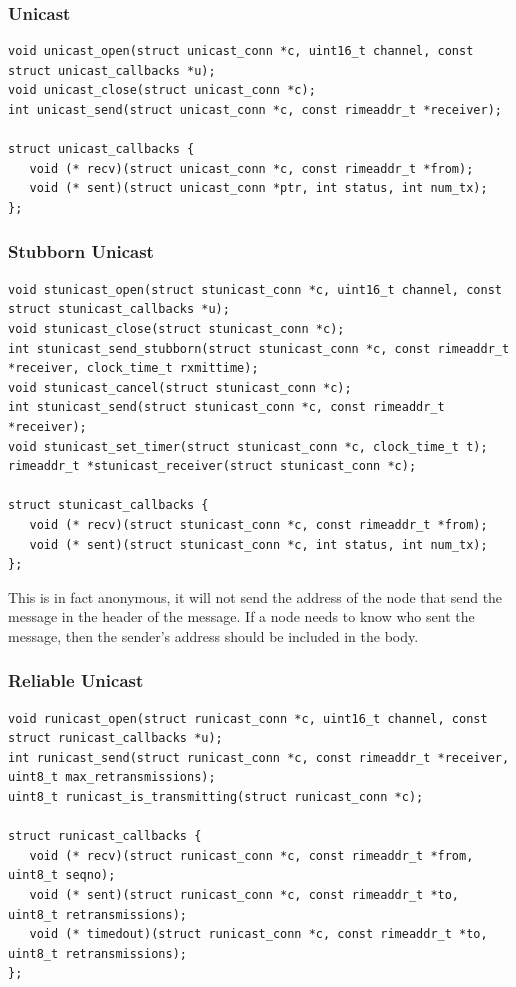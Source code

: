 \subsubsection{Unicast}

\begin{verbatim}
void unicast_open(struct unicast_conn *c, uint16_t channel, const struct unicast_callbacks *u);
void unicast_close(struct unicast_conn *c);
int unicast_send(struct unicast_conn *c, const rimeaddr_t *receiver);

struct unicast_callbacks {
   void (* recv)(struct unicast_conn *c, const rimeaddr_t *from);
   void (* sent)(struct unicast_conn *ptr, int status, int num_tx);
};
\end{verbatim}

\subsubsection{Stubborn Unicast}

\begin{verbatim}
void stunicast_open(struct stunicast_conn *c, uint16_t channel, const struct stunicast_callbacks *u);
void stunicast_close(struct stunicast_conn *c);
int stunicast_send_stubborn(struct stunicast_conn *c, const rimeaddr_t *receiver, clock_time_t rxmittime);
void stunicast_cancel(struct stunicast_conn *c);
int stunicast_send(struct stunicast_conn *c, const rimeaddr_t *receiver);
void stunicast_set_timer(struct stunicast_conn *c, clock_time_t t);
rimeaddr_t *stunicast_receiver(struct stunicast_conn *c);

struct stunicast_callbacks {
   void (* recv)(struct stunicast_conn *c, const rimeaddr_t *from);
   void (* sent)(struct stunicast_conn *c, int status, int num_tx);
};
\end{verbatim}

This is in fact anonymous, it will not send the address of the node that send the message in the header of the message. If a node needs to know who sent the message, then the sender's address should be included in the body.

\subsubsection{Reliable Unicast}

\begin{verbatim}
void runicast_open(struct runicast_conn *c, uint16_t channel, const struct runicast_callbacks *u);
int runicast_send(struct runicast_conn *c, const rimeaddr_t *receiver, uint8_t max_retransmissions);
uint8_t runicast_is_transmitting(struct runicast_conn *c);

struct runicast_callbacks {
   void (* recv)(struct runicast_conn *c, const rimeaddr_t *from, uint8_t seqno);
   void (* sent)(struct runicast_conn *c, const rimeaddr_t *to, uint8_t retransmissions);
   void (* timedout)(struct runicast_conn *c, const rimeaddr_t *to, uint8_t retransmissions);
};
\end{verbatim}

